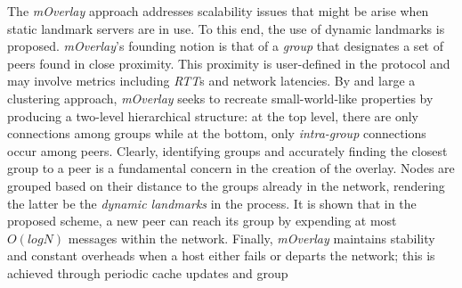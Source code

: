 The \emph{mOverlay} approach addresses scalability issues
that might be arise when static landmark servers are in use. 
To this end, the use of dynamic landmarks is proposed.
\emph{mOverlay}'s founding notion is that of a \emph{group} that 
designates a set of peers found in close proximity.
This proximity is user-defined in the protocol and 
may involve metrics including \emph{RTT}s and network latencies.
By and large a clustering approach, \emph{mOverlay} seeks to 
recreate small-world-like properties by producing a 
two-level hierarchical structure:
at the top level, there are only connections among groups 
while at the bottom, only \emph{intra-group} connections occur among peers.
Clearly, identifying groups and accurately finding the closest group 
to a peer is a fundamental concern in the creation of the overlay.
Nodes are grouped based on their distance to 
the groups already in the network, rendering
the latter be the \emph{dynamic landmarks} in the process. 
It is shown that in the proposed scheme, a new peer can 
reach its group by expending at most $O(logN)$ messages
within the network. 
Finally, \emph{mOverlay} maintains stability and constant 
overheads when a host either fails or departs the network;
this is achieved through periodic cache updates and group 
